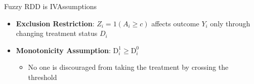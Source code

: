 \documentclass[hyperref={pdfpagelabels=false}]{beamer}
\begin{document}
\begin{frame}{Fuzzy RDD is IV}{Assumptions}
	\begin{itemize}
		
		
		\item \textbf{Exclusion Restriction}: $Z_{i}=1(A_i\geq c)$ affects outcome $Y_{i}$ only through changing treatment status $D_{i}$
		\vspace{0.2cm}
		\item \textbf{Monotonicity Assumption}: $\mathrm{D}^{1}_{i} \geq \mathrm{D}^{0}_{i}$
		\vspace{0.2cm}
		\begin{itemize}
			\item No one is discouraged from taking the treatment by crossing
			the threshold
		\end{itemize}
		
		
	\end{itemize}
\end{frame}
\end{document}

